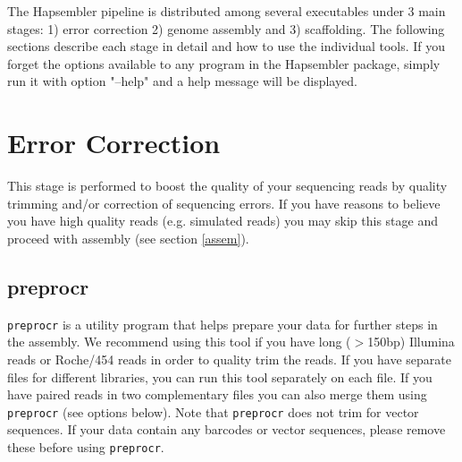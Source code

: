 \documentclass[12pt,a4paper]{report}
\begin{document}
The Hapsembler pipeline is distributed among several executables under 3 main stages: 1) error correction 2) genome assembly and 3) scaffolding. The following sections describe each stage in detail and how to use the individual tools. If you forget the options available to any program in the Hapsembler package, simply run it with option "--help" and a help message will be displayed.

\section{Error Correction}

This stage is performed to boost the quality of your sequencing reads by quality trimming and/or correction of sequencing errors. If you have reasons to believe you have high quality reads (e.g. simulated reads) you may skip this stage and proceed with assembly (see section \ref{assem}).

\subsection{preprocr}
\label{utils}

\texttt{preprocr} is a utility program that helps prepare your data for further steps in the assembly. We recommend using this tool if you have long ($>$150bp) Illumina reads or Roche/454 reads in order to quality trim the reads. If you have separate files for different libraries, you can run this tool separately on each file. If you have paired reads in two complementary files you can also merge them using \texttt{preprocr} (see options below). Note that \texttt{preprocr} does not trim for vector sequences. If your data contain any barcodes or vector sequences, please remove these before using \texttt{preprocr}.
\end{document}
